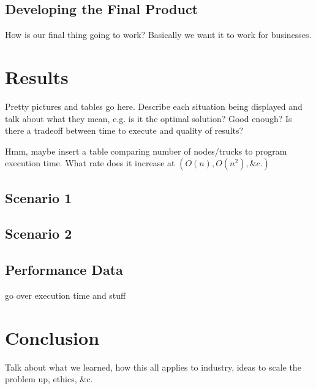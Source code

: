 \documentclass[letterpaper]{article}
\begin{document}

    \subsection{Developing the Final Product}
    \label{subsection:Developing_the_Final_Product}
    How is our final thing going to work? Basically we want it to work for businesses.

    \section{Results}
    \label{section:Results}
    Pretty pictures and tables go here. Describe each situation being displayed and talk about what they mean, e.g. is it the optimal solution? Good enough? Is there a tradeoff between time to execute and quality of results?

    Hmm, maybe insert a table comparing number of nodes/trucks to program execution time. What rate does it increase at $(O(n), O(n^2), \&c.)$

    \subsection{Scenario 1}

    \subsection{Scenario 2}

    \subsection{Performance Data}
    go over execution time and stuff

    \section{Conclusion}
    \label{section:Conclusion}
    Talk about what we learned, how this all applies to industry, ideas to scale the problem up, ethics, \&c.
\end{document}
